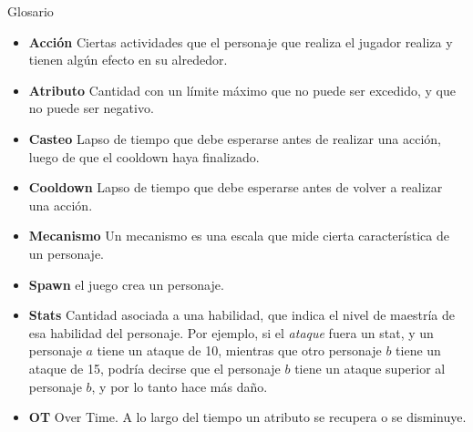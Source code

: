 \begin{section}{Glosario}
  \begin{itemize}
  \item \textbf{Acción} Ciertas actividades que el personaje que realiza el jugador realiza y tienen algún efecto en su alrededor.
  \item \textbf{Atributo} Cantidad con un límite máximo que no puede ser excedido, y que no puede ser negativo.
  \item \textbf{Casteo} Lapso de tiempo que debe esperarse antes de realizar una acción, luego de que el cooldown haya finalizado.
  \item \textbf{Cooldown} Lapso de tiempo que debe esperarse antes de volver a realizar una acción.
  \item \textbf{Mecanismo} Un mecanismo es una escala que mide cierta característica de un personaje.
  \item \textbf{Spawn} el juego crea un personaje.
  \item \textbf{Stats} Cantidad asociada a una habilidad, que indica el nivel de maestría de esa habilidad del personaje. Por ejemplo, si el \textit{ataque} fuera un stat, y un personaje $a$ tiene un ataque de 10, mientras que otro personaje $b$ tiene un ataque de 15, podría decirse que el personaje $b$ tiene un ataque superior al personaje $b$, y por lo tanto hace más daño.
  \item \textbf{OT} Over Time. A lo largo del tiempo un atributo se recupera o se disminuye.
    
  \end{itemize}
\end{section}
